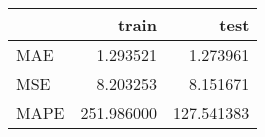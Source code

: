 \begin{tabular}{lrr}
\toprule
{} &       train &        test \\
\midrule
MAE  &    1.293521 &    1.273961 \\
MSE  &    8.203253 &    8.151671 \\
MAPE &  251.986000 &  127.541383 \\
\bottomrule
\end{tabular}
